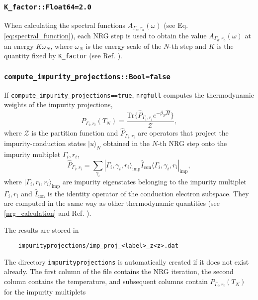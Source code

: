 \documentclass[notitlepage]{article}
\newcommand{\ket}[1]{|#1\rangle}
\newcommand{\bra}[1]{\langle #1 |}
\begin{document}
\subsubsection{\texttt{K\_factor::Float64=2.0}}
\label{nrg_Kfactor}
When calculating the spectral functions
$A_{\Gamma_a,r_a}(\omega)$ (see Eq.
\ref{eq:spectral_function}), each NRG step is used to obtain
the value $A_{\Gamma_a,r_a}(\omega)$ at an energy
$K\omega_N$, where $\omega_N$ is the energy scale of the
$N$-th step and $K$ is the quantity fixed by
\texttt{K\_factor} (see Ref. \cite{bulla2008}).

\subsubsection{\texttt{compute\_impurity\_projections::Bool=false}}
\label{nrg_computeimpurityprojections}
If \texttt{compute\_impurity\_projections==true},
\texttt{nrgfull} computes the thermodynamic weights of the
impurity projections,
\begin{equation}
    P_{\Gamma_i,r_i}(T_N)=\frac{\text{Tr}\{\hat P
    _{\Gamma_i,r_i} e^{-\beta_N \hat H}\}}{\mathcal Z},
\label{eq:impurity_projections}
\end{equation}
where $\mathcal Z$ is the partition function and
$\hat{P}_{\Gamma_i,r_i}$ are operators that project the
impurity-conduction states $\ket{u}_N$ obtained in the
$N$-th NRG step onto the impurity multiplet $\Gamma_i,r_i$,
\begin{equation}
    \hat P_{\Gamma_i,r_i} = \sum_{\gamma_i}
    \ket{\Gamma_i,\gamma_i,r_i}_\text{imp}
    \hat I _\text{con}
    \bra{\Gamma_i,\gamma_i,r_i}_\text{imp},
\label{eq:impurity_projection_operator}
\end{equation}
where $\ket{\Gamma_i,r_i,r_i}_\text{imp}$ are impurity
eigenstates belonging to the impurity multiplet
$\Gamma_i,r_i$ and $\hat I_\text{con}$ is the identity
operator of the conduction electron subspace. They are
computed in the same way as other thermodynamic quantities
(see \ref{nrg_calculation} and Ref. \cite{bulla2008}). 
\par
The results are stored in 
\begin{verbatim}
    impurityprojections/imp_proj_<label>_z<z>.dat
\end{verbatim}
The directory \texttt{impurityprojections} is automatically
created if it does not exist already. The first column of
the file contains the NRG iteration, the second column
contains the temperature, and subsequent columns contain
$P_{\Gamma_i,r_i}(T_N)$ for the impurity multiplets
\end{document}
